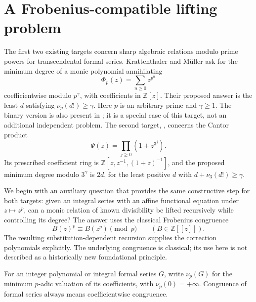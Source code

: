 \documentclass[11pt,a4paper]{article}
\theoremstyle{definition}
\theoremstyle{remark}\newtheorem{remark}[lemma]{Remark}
\begin{document}
\section{A Frobenius-compatible lifting problem}
\label{arith:section}

The first two existing targets concern sharp algebraic relations modulo prime
powers for transcendental formal series. Krattenthaler and M\"uller
\cite[Conjecture~4]{KMp} ask for the minimum degree of a monic polynomial
annihilating
\[
 \Phi_p(z)=\sum_{n\geq0}z^{p^n}
\]
coefficientwise modulo $p^\gamma$, with coefficients in $\mathbb Z[z]$.
Their proposed answer is the least $d$ satisfying $\nu_p(d!)\geq\gamma$.
Here $p$ is an arbitrary prime and $\gamma\geq1$.
The binary version is also present in \cite[Conjecture~4]{KKM2}; it is a
special case of this target, not an additional independent problem.
The second target, \cite[Conjecture~12]{KM3}, concerns the Cantor product
\[
 \Psi(z)=\prod_{j\geq0}(1+z^{3^j}).
\]
Its prescribed coefficient ring is
$\mathbb Z[z,z^{-1},(1+z)^{-1}]$, and the proposed minimum degree modulo
$3^\gamma$ is $2d$, for the least positive $d$ with
$d+\nu_3(d!)\geq\gamma$.

We begin with an auxiliary question that provides the same constructive
step for both targets: given an integral series with an affine functional
equation under $z\mapsto z^p$, can a monic relation of known divisibility
be lifted recursively while controlling its degree? The answer uses the
classical Frobenius congruence
\begin{equation}\label{arith:frobenius}
 B(z)^p\equiv B(z^p)\pmod p\qquad(B\in\mathbb Z[[z]]).
\end{equation}
The resulting substitution-dependent recursion supplies the correction
polynomials explicitly. The underlying congruence is classical; its use here
is not described as a historically new foundational principle.

For an integer polynomial or integral formal series $G$, write
$\nu_p(G)$ for the minimum $p$-adic valuation of its coefficients, with
$\nu_p(0)=+\infty$. Congruence of formal series always means coefficientwise
congruence.
\end{document}
